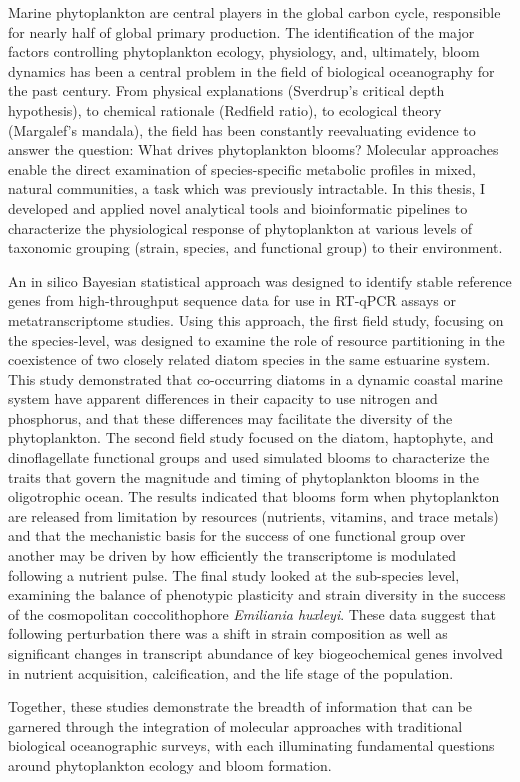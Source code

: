 % 
% 
%
 Marine phytoplankton are central players in the global carbon cycle, responsible for nearly half of global primary production. The identification of the major factors controlling phytoplankton ecology, physiology, and, ultimately, bloom dynamics has been a central problem in the field of biological oceanography for the past century. From physical explanations (Sverdrup's critical depth hypothesis), to chemical rationale (Redfield ratio), to ecological theory (Margalef's mandala), the field has been constantly reevaluating evidence to answer the question: What drives phytoplankton blooms? Molecular approaches enable the direct examination of species-specific metabolic profiles in mixed, natural communities, a task which was previously intractable. In this thesis, I developed and applied novel analytical tools and bioinformatic pipelines to characterize the physiological response of phytoplankton at various levels of taxonomic grouping (strain, species, and functional group) to their environment.   \par
An in silico Bayesian statistical approach was designed to identify stable reference genes from high-throughput sequence data for use in RT-qPCR assays or metatranscriptome studies. Using this approach, the first field study, focusing on the species-level, was designed to examine the role of resource partitioning in the coexistence of two closely related diatom species in the same estuarine system. This study demonstrated that co-occurring diatoms in a dynamic coastal marine system have apparent differences in their capacity to use nitrogen and phosphorus, and that these differences may facilitate the diversity of the phytoplankton. The second field study focused on the diatom, haptophyte, and dinoflagellate functional groups and used simulated blooms to characterize the traits that govern the magnitude and timing of phytoplankton blooms in the oligotrophic ocean. The results indicated that blooms form when phytoplankton are released from limitation by resources (nutrients, vitamins, and trace metals) and that the mechanistic basis for the success of one functional group over another may be driven by how efficiently the transcriptome is modulated following a nutrient pulse. The final study looked at the sub-species level, examining the balance of phenotypic plasticity and strain diversity in the success of the cosmopolitan coccolithophore \textit{Emiliania huxleyi}. These data suggest that following perturbation there was a shift in strain composition as well as significant changes in transcript abundance of key biogeochemical genes involved in nutrient acquisition, calcification, and the life stage of the population.\par
Together, these studies demonstrate the breadth of information that can be garnered through the integration of molecular approaches with traditional biological oceanographic surveys, with each illuminating fundamental questions around phytoplankton ecology and bloom formation.



